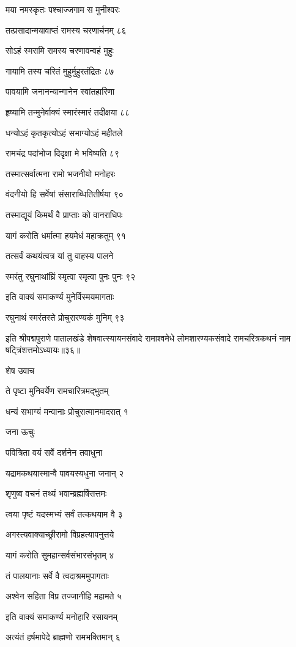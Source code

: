 मया नमस्कृतः पश्चाज्जगाम स मुनीश्वरः

तत्प्रसादान्मयावाप्तं रामस्य चरणार्चनम् ८६

सोऽहं स्मरामि रामस्य चरणावन्वहं मुहुः

गायामि तस्य चरितं मुहुर्मुहुरतंद्रितः ८७

पावयामि जनानन्यान्गानेन स्वांतहारिणा

हृष्यामि तन्मुनेर्वाक्यं स्मारंस्मारं तदीक्षया ८८

धन्योऽहं कृतकृत्योऽहं सभाग्योऽहं महीतले

रामचंद्र पदांभोज दिदृक्षा मे भविष्यति ८९

तस्मात्सर्वात्मना रामो भजनीयो मनोहरः

वंदनीयो हि सर्वेषां संसाराब्धितितीर्षया ९०

तस्माद्यूयं किमर्थं वै प्राप्ताः को वानराधिपः

यागं करोति धर्मात्मा हयमेधं महाक्रतुम् ९१

तत्सर्वं कथयंत्वत्र यां तु वाहस्य पालने

स्मरंतु रघुनाथांघ्रिं स्मृत्वा स्मृत्वा पुनः पुनः ९२

इति वाक्यं समाकर्ण्य मुनेर्विस्मयमागताः

रघुनाथं स्मरंतस्ते प्रोचुरारण्यकं मुनिम् ९३

इति श्रीपद्मपुराणे पातालखंडे शेषवात्स्यायनसंवादे रामाश्वमेधे लोमशारण्यकसंवादे रामचरित्रकथनं नाम षट्त्रिंशत्तमोऽध्यायः॥३६॥


शेष उवाच

ते पृष्टा मुनिवर्येण रामचारित्रमद्भुतम्

धन्यं सभाग्यं मन्वानाः प्रोचुरात्मानमादरात् १

जना ऊचुः

पवित्रिता वयं सर्वे दर्शनेन तवाधुना

यद्रामकथयास्मान्वै पावयस्यधुना जनान् २

शृणुष्व वचनं तथ्यं भवान्ब्रह्मर्षिसत्तमः

त्वया पृष्टं यदस्मभ्यं सर्वं तत्कथयाम वै ३

अगस्त्यवाक्याच्छ्रीरामो विप्रहत्यापनुत्तये

यागं करोति सुमहान्सर्वसंभारसंभृतम् ४

तं पालयानाः सर्वे वै त्वदाश्रममुपागताः

अश्वेन सहिता विप्र तज्जानीहि महामते ५

इति वाक्यं समाकर्ण्य मनोहारि रसायनम्

अत्यंतं हर्षमापेदे ब्राह्मणो रामभक्तिमान् ६

